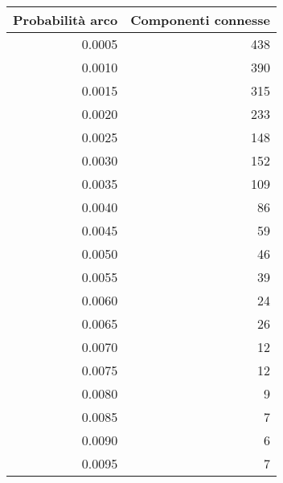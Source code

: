 \begin{tabular}{|r|r|}
\toprule \hline
 Probabilità arco &  Componenti connesse \\ \hline

\midrule
           0.0005 &                  438 \\ \hline

           0.0010 &                  390 \\ \hline

           0.0015 &                  315 \\ \hline

           0.0020 &                  233 \\ \hline

           0.0025 &                  148 \\ \hline

           0.0030 &                  152 \\ \hline

           0.0035 &                  109 \\ \hline

           0.0040 &                   86 \\ \hline

           0.0045 &                   59 \\ \hline

           0.0050 &                   46 \\ \hline

           0.0055 &                   39 \\ \hline

           0.0060 &                   24 \\ \hline

           0.0065 &                   26 \\ \hline

           0.0070 &                   12 \\ \hline

           0.0075 &                   12 \\ \hline

           0.0080 &                    9 \\ \hline

           0.0085 &                    7 \\ \hline

           0.0090 &                    6 \\ \hline

           0.0095 &                    7 \\ \hline


\end{tabular}
